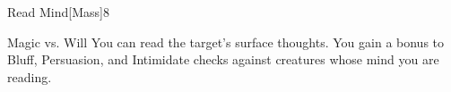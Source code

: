 \begin{spellsection}{Read Mind}[Mass]{8}
\begin{spellheader}
\end{spellheader}
\begin{spellcontent}
    \begin{spelltargetinginfo}
    \end{spelltargetinginfo}
    \begin{spelleffects}
        \begin{spellattack}{Magic vs. Will}
            \spellsuccess You can read the target's surface thoughts. You gain a  bonus to Bluff, Persuasion, and Intimidate checks against creatures whose mind you are reading.
        \end{spellattack}
    \end{spelleffects}
\end{spellcontent}
\begin{spellfooter}
\end{spellfooter}
\end{spellsection}

